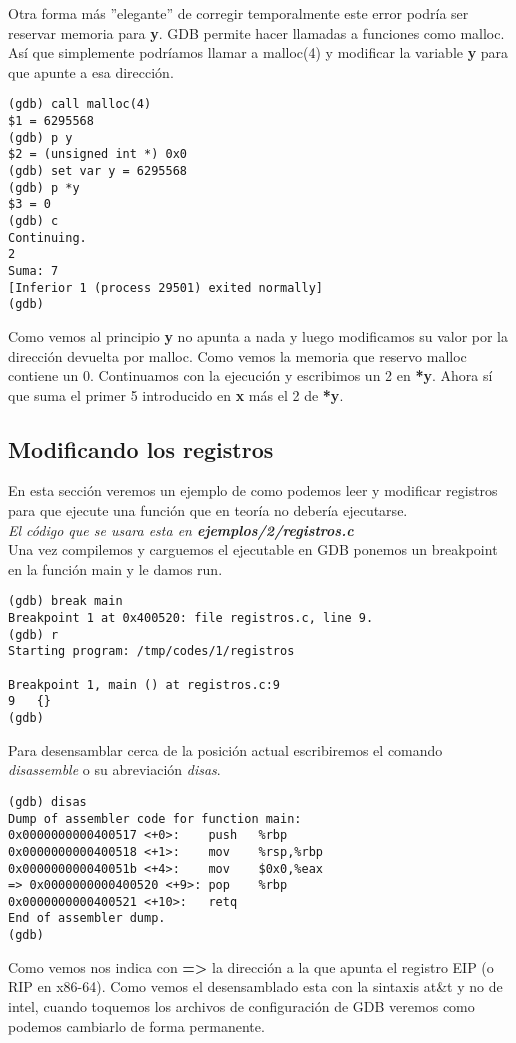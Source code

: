 Otra forma más ''elegante'' de corregir temporalmente este error podría ser reservar memoria para \textbf{y}. GDB permite hacer llamadas a funciones como malloc. Así que simplemente podríamos llamar a malloc(4) y modificar la variable \textbf{y} para que apunte a esa dirección.
\begin{verbatim}
(gdb) call malloc(4)
$1 = 6295568
(gdb) p y
$2 = (unsigned int *) 0x0
(gdb) set var y = 6295568
(gdb) p *y
$3 = 0
(gdb) c
Continuing.
2
Suma: 7
[Inferior 1 (process 29501) exited normally]
(gdb) 
\end{verbatim}
Como vemos al principio \textbf{y} no apunta a nada y luego modificamos su valor por la dirección devuelta por malloc. Como vemos la memoria que reservo malloc contiene un 0. Continuamos con la ejecución y escribimos un 2 en \textbf{*y}. Ahora sí que suma el primer 5 introducido en \textbf{x} más el 2 de \textbf{*y}.


\subsection{Modificando los registros}
En esta sección veremos un ejemplo de como podemos leer y modificar registros para que ejecute una función que en teoría no debería ejecutarse.\\

\emph{El código que se usara esta en \textbf{ejemplos/2/registros.c}}\\

Una vez compilemos y carguemos el ejecutable en GDB ponemos un breakpoint en la función main y le damos run.
\begin{verbatim}
(gdb) break main
Breakpoint 1 at 0x400520: file registros.c, line 9.
(gdb) r
Starting program: /tmp/codes/1/registros 

Breakpoint 1, main () at registros.c:9
9	{}
(gdb) 
\end{verbatim}

Para desensamblar cerca de la posición actual escribiremos el comando \emph{disassemble} o su abreviación \emph{disas}.
\begin{verbatim}
(gdb) disas
Dump of assembler code for function main:
0x0000000000400517 <+0>:	push   %rbp
0x0000000000400518 <+1>:	mov    %rsp,%rbp
0x000000000040051b <+4>:	mov    $0x0,%eax
=> 0x0000000000400520 <+9>:	pop    %rbp
0x0000000000400521 <+10>:	retq   
End of assembler dump.
(gdb) 
\end{verbatim}
Como vemos nos indica con \textbf{=>} la dirección a la que apunta el registro EIP (o RIP en x86-64). Como vemos el desensamblado esta con la sintaxis at\&t y no de intel, cuando toquemos los archivos de configuración de GDB veremos como podemos cambiarlo de forma permanente.

